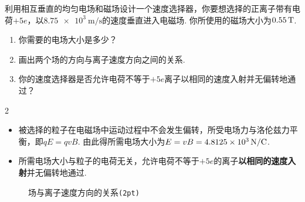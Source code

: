 \documentclass[quiet, fontset = fandol, AutoFakeSlant, 10pt]{ctexart}
\let \emph \textbf
\begin{document}
\begin{problem}[本题8分]
    利用相互垂直的均匀电场和磁场设计一个速度选择器，你要想选择的正离子带有电荷$+5e$，以$\qty{8.75e3}{\m/\s}$的速度垂直进入电磁场. 你所使用的磁场大小为$\qty{0.55}\T$.
    \begin{enumerate}
        \item 你需要的电场大小是多少？
        \item 画出两个场的方向与离子速度方向之间的关系.
        \item 你的速度选择器是否允许电荷不等于$+5e$离子以相同的速度入射并无偏转地通过？
    \end{enumerate}
\end{problem}
\begin{paracol}{2}
\begin{solution}\leavevmode
    \begin{itemize}
        \item 被选择的粒子在电磁场中运动过程中不会发生偏转，所受电场力与洛伦兹力平衡，即$qE=qvB$. 由此得所需电场大小为$E=vB=\qty{4.8125e3}{\N/\C}$.
        \item 所需电场大小与粒子的电荷无关，允许电荷不等于$+5e$的离子\emph{以相同的速度入射}并无偏转地通过.
    \end{itemize}
    \switchcolumn\vspace{\fill}
    \begin{figure}[htbp]
        \centering
        \caption*{场与离子速度方向的关系\texttt{(2pt)}}
    \end{figure}
    \vspace*{\fill}
\end{solution}
\end{paracol}
\end{document}
